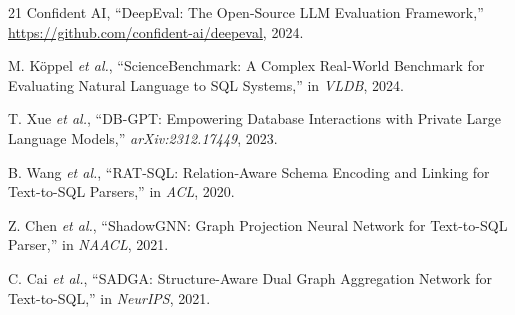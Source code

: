 \documentclass[conference]{IEEEtran}
\begin{document}
\begin{thebibliography}{21}
Confident AI,
``DeepEval: The Open-Source LLM Evaluation Framework,''
\url{https://github.com/confident-ai/deepeval}, 2024.

M. K{\"o}ppel \textit{et al.},
``ScienceBenchmark: A Complex Real-World Benchmark for Evaluating
Natural Language to SQL Systems,''
in \textit{VLDB}, 2024.

T. Xue \textit{et al.},
``DB-GPT: Empowering Database Interactions with Private Large
Language Models,''
\textit{arXiv:2312.17449}, 2023.

B. Wang \textit{et al.},
``RAT-SQL: Relation-Aware Schema Encoding and Linking for Text-to-SQL
Parsers,''
in \textit{ACL}, 2020.

Z. Chen \textit{et al.},
``ShadowGNN: Graph Projection Neural Network for Text-to-SQL Parser,''
in \textit{NAACL}, 2021.

C. Cai \textit{et al.},
``SADGA: Structure-Aware Dual Graph Aggregation Network for
Text-to-SQL,''
in \textit{NeurIPS}, 2021.

\end{thebibliography}
\end{document}
